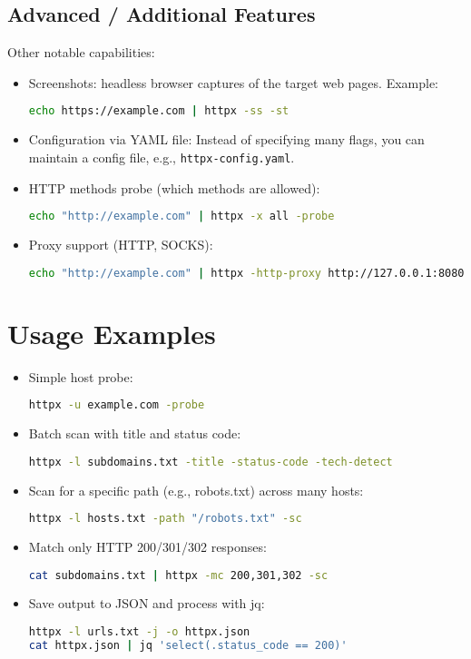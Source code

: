 \documentclass[11pt,a4paper]{article}
\begin{document}
\subsection*{Advanced / Additional Features}
Other notable capabilities:  
\begin{itemize}
  \item Screenshots: headless browser captures of the target web pages. Example:  
\begin{lstlisting}[language=bash]
echo https://example.com | httpx -ss -st
\end{lstlisting}

  \item Configuration via YAML file: Instead of specifying many flags, you can maintain a config file, e.g., \texttt{httpx-config.yaml}.
  \item HTTP methods probe (which methods are allowed):  
\begin{lstlisting}[language=bash]
echo "http://example.com" | httpx -x all -probe
\end{lstlisting}

  \item Proxy support (HTTP, SOCKS):  
\begin{lstlisting}[language=bash]
echo "http://example.com" | httpx -http-proxy http://127.0.0.1:8080
\end{lstlisting}

\end{itemize}

\section*{Usage Examples}
\begin{itemize}
  \item Simple host probe:  
\begin{lstlisting}[language=bash]
httpx -u example.com -probe
\end{lstlisting}
  \item Batch scan with title and status code:  
\begin{lstlisting}[language=bash]
httpx -l subdomains.txt -title -status-code -tech-detect
\end{lstlisting}
  \item Scan for a specific path (e.g., robots.txt) across many hosts:  
\begin{lstlisting}[language=bash]
httpx -l hosts.txt -path "/robots.txt" -sc
\end{lstlisting}
  \item Match only HTTP 200/301/302 responses:  
\begin{lstlisting}[language=bash]
cat subdomains.txt | httpx -mc 200,301,302 -sc
\end{lstlisting}
  \item Save output to JSON and process with jq:  
\begin{lstlisting}[language=bash]
httpx -l urls.txt -j -o httpx.json
cat httpx.json | jq 'select(.status_code == 200)'
\end{lstlisting}

\end{itemize}
\end{document}

